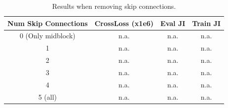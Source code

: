 \begin{table}[!ht]
    \centering
    \caption{Results when removing skip connections.}
    \label{tab:abl-skip-connection}
    \begin{tabular}{cccc}
        \hline
        Num Skip Connections & CrossLoss (x1e6) & Eval JI & Train JI \\
        \hline
        0 (Only midblock)    & n.a.             & n.a.    & n.a.     \\
        1                    & n.a.             & n.a.    & n.a.     \\
        2                    & n.a.             & n.a.    & n.a.     \\
        3                    & n.a.             & n.a.    & n.a.     \\
        4                    & n.a.             & n.a.    & n.a.     \\
        5 (all)              & n.a.             & n.a.    & n.a.     \\
        \hline
    \end{tabular}
\end{table}
